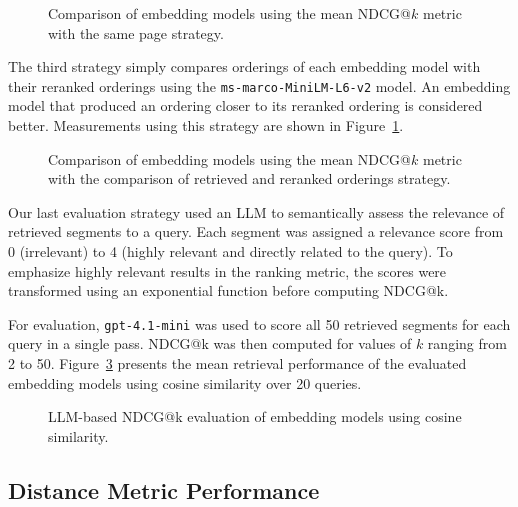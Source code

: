 \documentclass[conference]{IEEEtran}
\begin{document}
\begin{figure}
    \centering
    
    \caption{Comparison of embedding models using the mean NDCG@\(k\) metric with the same page strategy.}
    \label{fig:model_comparison_same_page}
\end{figure}

The third strategy simply compares orderings of each embedding model with their reranked orderings using the \texttt{ms-marco-MiniLM-L6-v2} model. An embedding model that produced an ordering closer to its reranked ordering is considered better. Measurements using this strategy are shown in Figure~\ref{fig:model_comparison_same_page}.

\begin{figure}
    \centering
    
    \caption{Comparison of embedding models using the mean NDCG@\(k\) metric with the comparison of retrieved and reranked orderings strategy.}
    \label{fig:model_comparison_reranked_optimal}
\end{figure}


Our last evaluation strategy used an LLM to semantically assess the relevance of retrieved segments to a query. Each segment was assigned a relevance score from 0 (irrelevant) to 4 (highly relevant and directly related to the query). To emphasize highly relevant results in the ranking metric, the scores were transformed using an exponential function before computing NDCG@k.

For evaluation, \texttt{gpt-4.1-mini} was used to score all 50 retrieved segments for each query in a single pass. NDCG@k was then computed for values of \(k\) ranging from 2 to 50. Figure~\ref{fig:llm_scored_models} presents the mean retrieval performance of the evaluated embedding models using cosine similarity over 20 queries.

\begin{figure}[ht]
    \centering
    
    \caption{LLM-based NDCG@k evaluation of embedding models using cosine similarity.}
    \label{fig:llm_scored_models}
\end{figure}











\subsection{Distance Metric Performance}
\end{document}
